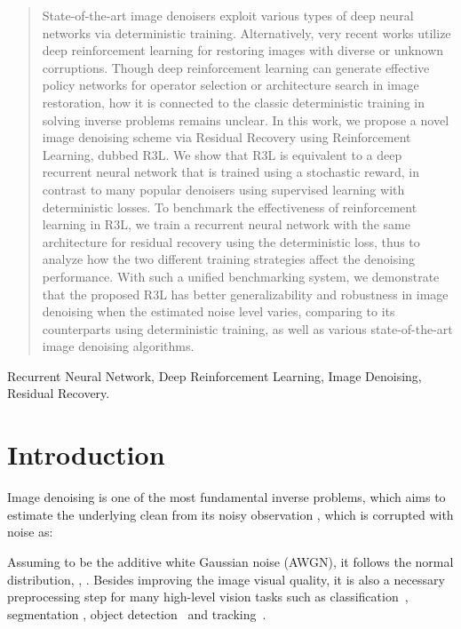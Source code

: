 \documentclass{article}
\begin{document}
\ninept
\maketitle
\begin{abstract}
State-of-the-art image denoisers exploit various types of deep neural networks via deterministic training. Alternatively, very recent works utilize deep reinforcement learning for restoring images with diverse or unknown corruptions. Though deep reinforcement learning can generate effective policy networks for operator selection or architecture search in image restoration, how it is connected to the classic deterministic training in solving inverse problems remains unclear. In this work, we propose a novel image denoising scheme via Residual Recovery using Reinforcement Learning, dubbed R3L. We show that R3L is equivalent to a deep recurrent neural network that is trained using a stochastic reward, in contrast to many popular denoisers using supervised learning with deterministic losses. To benchmark the effectiveness of reinforcement learning in R3L, we train a recurrent neural network with the same architecture for residual recovery  using the deterministic loss, thus to analyze how the two different training strategies affect the denoising performance. With such a unified benchmarking system, we demonstrate that the proposed R3L has better generalizability and robustness in image denoising when the estimated noise level varies, comparing to its counterparts using deterministic training, as well as various state-of-the-art image denoising algorithms. 
\end{abstract}
\begin{keywords}
Recurrent Neural Network, Deep Reinforcement Learning, Image Denoising, Residual Recovery.
\end{keywords}
\section{Introduction}

Image denoising is one of the most fundamental inverse problems, which aims to estimate the underlying clean  from its noisy observation , which is corrupted with noise  as:

Assuming  to be the additive white Gaussian noise (AWGN), it follows the normal distribution, \ie,  . Besides improving the image visual quality, it is also a necessary preprocessing step for many high-level vision tasks such as classification~\cite{liu2018image}, segmentation \cite{liu2020connecting}, object detection~\cite{milyaev2017towards} and tracking~\cite{na2019mixture}. 
\end{document}
